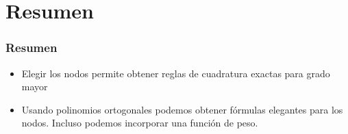 \documentclass[english, spanish, fleqn,%
hyperref = {colorlinks, urlcolor = blue}%
]{beamer}
\begin{document}
\section{Resumen}

\begin{frame}
  \setcounter{beamerpauses}{2}
  \frametitle{Resumen}

  \begin{itemize}
  \item
    Elegir los nodos permite obtener reglas de cuadratura
    exactas para grado mayor
  \item
    Usando polinomios ortogonales
    podemos obtener fórmulas elegantes para los nodos.
    Incluso podemos incorporar una función de peso.
  \end{itemize}
\end{frame}
\end{document}
